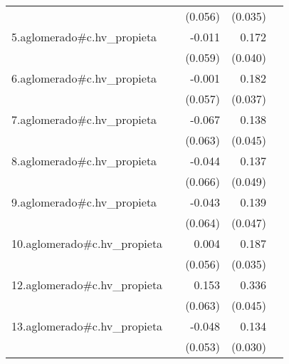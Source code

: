{\begin{longtable}{l*{4}{D{.}{.}{-1}}}
            &                     &     (0.056)         &     (0.035)         &                     \\
\addlinespace
5.aglomerado#c.hv\_propieta&                     &      -0.011         &       0.172\sym{***}&                     \\
            &                     &     (0.059)         &     (0.040)         &                     \\
\addlinespace
6.aglomerado#c.hv\_propieta&                     &      -0.001         &       0.182\sym{***}&                     \\
            &                     &     (0.057)         &     (0.037)         &                     \\
\addlinespace
7.aglomerado#c.hv\_propieta&                     &      -0.067         &       0.138\sym{**} &                     \\
            &                     &     (0.063)         &     (0.045)         &                     \\
\addlinespace
8.aglomerado#c.hv\_propieta&                     &      -0.044         &       0.137\sym{**} &                     \\
            &                     &     (0.066)         &     (0.049)         &                     \\
\addlinespace
9.aglomerado#c.hv\_propieta&                     &      -0.043         &       0.139\sym{**} &                     \\
            &                     &     (0.064)         &     (0.047)         &                     \\
\addlinespace
10.aglomerado#c.hv\_propieta&                     &       0.004         &       0.187\sym{***}&                     \\
            &                     &     (0.056)         &     (0.035)         &                     \\
\addlinespace
12.aglomerado#c.hv\_propieta&                     &       0.153\sym{*}  &       0.336\sym{***}&                     \\
            &                     &     (0.063)         &     (0.045)         &                     \\
\addlinespace
13.aglomerado#c.hv\_propieta&                     &      -0.048         &       0.134\sym{***}&                     \\
            &                     &     (0.053)         &     (0.030)         &                     \\

\end{longtable}}
